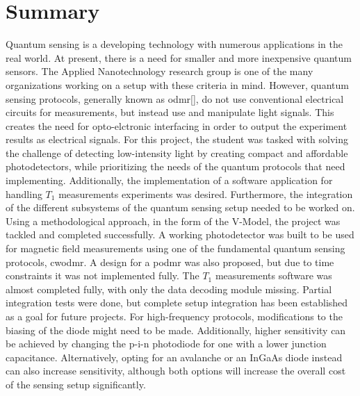 \documentclass{report}
\begin{document}
	\chapter{Summary}
	Quantum sensing is a developing technology with numerous applications in the real world. At present, there is a need for smaller and more inexpensive quantum sensors. The Applied Nanotechnology research group is one of the many organizations working on a setup with these criteria in mind. However, quantum sensing protocols, generally known as \gls{odmr}[], do not use conventional electrical circuits for measurements, but instead use and manipulate light signals. This creates the need for opto-elctronic interfacing in order to output the experiment results as electrical signals. For this project, the student was tasked with solving the challenge of detecting low-intensity light by creating compact and affordable photodetectors, while prioritizing the needs of the quantum protocols that need implementing. Additionally, the implementation of a software application for handling $T_1$ measurements experiments was desired. Furthermore, the integration of the different subsystems of the quantum sensing setup needed to be worked on. Using a methodological approach, in the form of the V-Model, the project was tackled and completed successfully. A working photodetector was built to be used for magnetic field measurements using one of the fundamental quantum sensing protocols, \gls{cwodmr}. A design for a \gls{podmr} was also proposed, but due to time constraints it was not implemented fully. The $T_1$ measurements software was almost completed fully, with only the data decoding module missing. Partial integration tests were done, but complete setup integration has been established as a goal for future projects. For high-frequency protocols, modifications to the biasing of the diode might need to be made. Additionally, higher sensitivity can be achieved by changing the p-i-n photodiode for one with a lower junction capacitance. Alternatively, opting for an avalanche or an InGaAs diode instead can also increase sensitivity, although both options will increase the overall cost of the sensing setup significantly.
	
	
\end{document}
